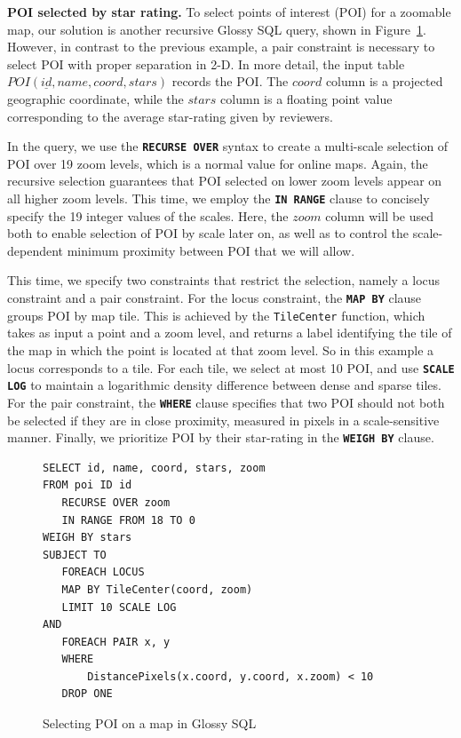 \documentclass[11pt, oneside]{report}
\newcommand{\minisec}[1]{\noindent\textbf{#1.}}
\begin{document}
{\minisec{POI selected by star rating}
To select points of interest (POI) for a zoomable map, our solution is another recursive Glossy SQL query, shown in Figure~\ref{fig:glossy:sql:poi}. However, in contrast to the previous example, a pair constraint is necessary to select POI with proper separation in 2-D. 
In more detail, the input table $POI(\underline{id}, name, coord, stars)$ records the POI. The $coord$ column is a projected geographic coordinate, while the $stars$ column is a floating point value corresponding to the average star-rating given by reviewers.

In the query, we use the \textbf{\texttt{RECURSE OVER}} syntax to create a multi-scale selection of POI over 19 zoom levels, which is a normal value for online maps. Again, the recursive selection guarantees that POI selected on lower zoom levels appear on all higher zoom levels. This time, we employ the \textbf{\texttt{IN RANGE}} clause to concisely specify the 19 integer values of the scales. Here, the $zoom$ column will be used both to enable selection of POI by scale later on, as well as to control the scale-dependent minimum proximity between POI that we will allow.

This time, we specify two constraints that restrict the selection, namely a locus constraint and a pair constraint. For the locus constraint, the \textbf{\texttt{MAP BY}} clause groups POI by map tile. This is achieved by the \texttt{TileCenter} function, which takes as input a point and a zoom level, and returns a label identifying the tile of the map in which the point is located at that zoom level. So in this example a locus corresponds to a tile. For each tile, we select at most 10 POI, and use \textbf{\texttt{SCALE LOG}} to maintain a logarithmic density difference between dense and sparse tiles. For the pair constraint, the \textbf{\texttt{WHERE}} clause specifies that two POI should not both be selected if they are in close proximity, measured in pixels in a scale-sensitive manner. Finally, we prioritize POI by their star-rating in the \textbf{\texttt{WEIGH BY}} clause. 

\begin{figure}[!t]
\begin{center}
\begin{lstlisting}
SELECT id, name, coord, stars, zoom
FROM poi ID id
   RECURSE OVER zoom 
   IN RANGE FROM 18 TO 0 
WEIGH BY stars
SUBJECT TO
   FOREACH LOCUS
   MAP BY TileCenter(coord, zoom)
   LIMIT 10 SCALE LOG
AND
   FOREACH PAIR x, y
   WHERE 
       DistancePixels(x.coord, y.coord, x.zoom) < 10
   DROP ONE
\end{lstlisting}
\caption{Selecting POI on a map in Glossy SQL}
\label{fig:glossy:sql:poi}
\end{center}
\end{figure}

}
\end{document}
